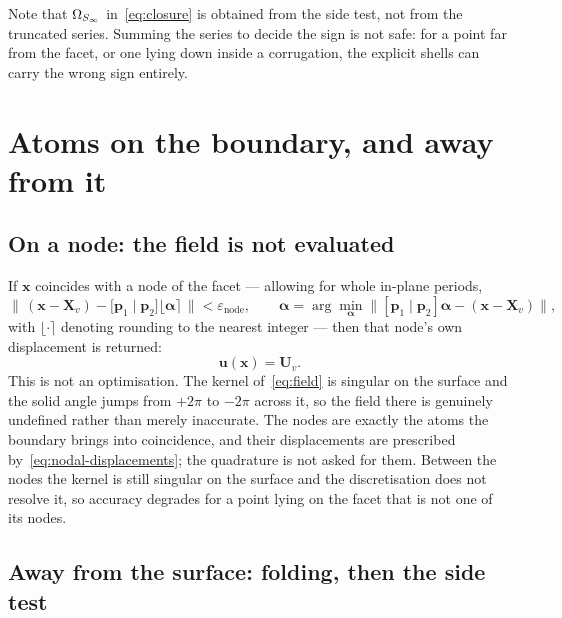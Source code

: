 Note that $\Omega_{S_{\infty}}$ in~\eqref{eq:closure} is obtained from the side test,
not from the truncated series. Summing the series to decide the sign is not
safe: for a point far from the facet, or one lying down inside a corrugation,
the explicit shells can carry the wrong sign entirely.

\section*{Atoms on the boundary, and away from it}

\subsection*{On a node: the field is not evaluated}

If $\mathbf{x}$ coincides with a node of the facet --- allowing for whole
in-plane periods,
\begin{equation}
  \bigl\lVert\, (\mathbf{x} - \mathbf{X}_v)
    - \bigl[\mathbf{p}_1 \mid \mathbf{p}_2\bigr]
      \bigl\lfloor \boldsymbol{\alpha} \bigr\rceil \,\bigr\rVert
  < \varepsilon_{\text{node}},
  \qquad
  \boldsymbol{\alpha}
  = \arg\min_{\boldsymbol{\alpha}}
    \bigl\lVert [\mathbf{p}_1\!\mid\!\mathbf{p}_2]\boldsymbol{\alpha}
      - (\mathbf{x}-\mathbf{X}_v) \bigr\rVert ,
  \label{eq:node-match}
\end{equation}
with $\lfloor\cdot\rceil$ denoting rounding to the nearest integer --- then that
node's own displacement is returned:
\begin{equation}
  \mathbf{u}(\mathbf{x}) = \mathbf{U}_v .
  \label{eq:node-shortcircuit}
\end{equation}
This is not an optimisation. The kernel of~\eqref{eq:field} is singular on the
surface and the solid angle jumps from $+2\pi$ to $-2\pi$ across it, so the
field there is genuinely undefined rather than merely inaccurate. The nodes are
exactly the atoms the boundary brings into coincidence, and their displacements
are prescribed by~\eqref{eq:nodal-displacements}; the quadrature is not asked
for them. Between the nodes the kernel is still singular on the surface and the
discretisation does not resolve it, so accuracy degrades for a point lying on the
facet that is not one of its nodes.

\subsection*{Away from the surface: folding, then the side test}

